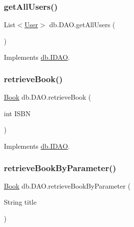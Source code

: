 \mbox{\label{classdb_1_1_d_a_o_a3b627b7177990799fd02e0c38b8adb70}} 
\subsubsection{\texorpdfstring{get\+All\+Users()}{getAllUsers()}}
{\footnotesize\ttfamily List$<$\hyperlink{classserver_1_1data_1_1_user}{User}$>$ db.\+D\+A\+O.\+get\+All\+Users (\begin{DoxyParamCaption}{ }\end{DoxyParamCaption})}



Implements \hyperlink{interfacedb_1_1_i_d_a_o_a88b60729d9517ca9aa31b7db7ae07aee}{db.\+I\+D\+AO}.

\mbox{\label{classdb_1_1_d_a_o_ade778f907d0a74dc27c4fc03f8709815}} 
\subsubsection{\texorpdfstring{retrieve\+Book()}{retrieveBook()}}
{\footnotesize\ttfamily \hyperlink{classserver_1_1data_1_1_book}{Book} db.\+D\+A\+O.\+retrieve\+Book (\begin{DoxyParamCaption}\item[{int}]{I\+S\+BN }\end{DoxyParamCaption})}



Implements \hyperlink{interfacedb_1_1_i_d_a_o_a1457ecf91799eaacd17cd3259826fc36}{db.\+I\+D\+AO}.

\mbox{\label{classdb_1_1_d_a_o_a1f8580da682f8a8af4896c491c3b6611}} 
\subsubsection{\texorpdfstring{retrieve\+Book\+By\+Parameter()}{retrieveBookByParameter()}}
{\footnotesize\ttfamily \hyperlink{classserver_1_1data_1_1_book}{Book} db.\+D\+A\+O.\+retrieve\+Book\+By\+Parameter (\begin{DoxyParamCaption}\item[{String}]{title }\end{DoxyParamCaption})}



